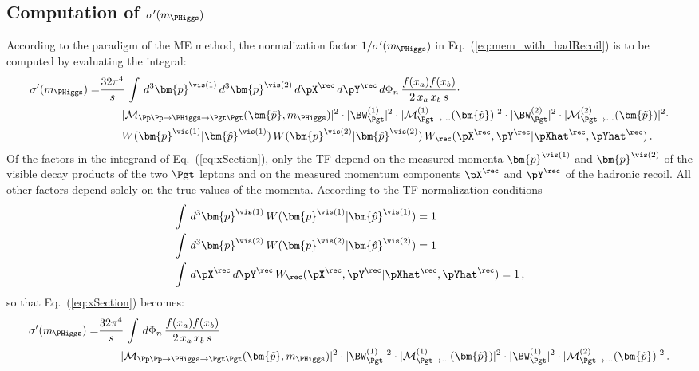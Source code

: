 \subsection{Computation of $\sigma'(m_{\PHiggs})$}
\label{sec:mem_xSection}

According to the paradigm of the ME method, the normalization factor
$1/\sigma'(m_{\PHiggs})$ in Eq.~(\ref{eq:mem_with_hadRecoil}) is to be computed
by evaluating the integral:
\begin{align}
\sigma'(m_{\PHiggs}) = &
  \frac{32\pi^{4}}{s} \, \int \, d^{3}\bm{p}^{\vis(1)} \, d^{3}\bm{p}^{\vis(2)} \, d\pX^{\rec} \, d\pY^{\rec} \, 
  d\Phi_{n} \, \frac{f(x_{a}) f(x_{b})}{2 \, x_{a} \, x_{b} \, s} \cdot \hspace{2cm} \nonumber \\
& \qquad \vert \mathcal{M}_{\Pp\Pp \to \PHiggs \to \Pgt\Pgt}(\bm{\tilde{p}},m_{\PHiggs}) \vert^{2} 
  \cdot \vert \BW^{(1)}_{\Pgt} \vert^{2} \cdot \vert \mathcal{M}^{(1)}_{\Pgt\to\cdots}(\bm{\tilde{p}}) \vert^{2} 
  \cdot \vert \BW^{(2)}_{\Pgt} \vert^{2} \cdot \vert
  \mathcal{M}^{(2)}_{\Pgt\to\cdots}(\bm{\tilde{p}}) \vert^{2} \cdot \nonumber \\
& \qquad W(\bm{p}^{\vis(1)}|\bm{\hat{p}}^{\vis(1)}) \, W(\bm{p}^{\vis(2)}|\bm{\hat{p}}^{\vis(2)}) \, W_{\rec}( \pX^{\rec},\pY^{\rec} | \pXhat^{\rec},\pYhat^{\rec} ) \, .
\label{eq:xSection}
\end{align}
Of the factors in the integrand of Eq.~(\ref{eq:xSection}),
only the TF depend on the measured momenta $\bm{p}^{\vis(1)}$ and $\bm{p}^{\vis(2)}$ of the visible decay products of the two $\Pgt$ leptons
and on the measured momentum components $\pX^{\rec}$ and $\pY^{\rec}$ of the hadronic recoil.
All other factors depend solely on the true values of the momenta.
According to the TF normalization conditions
\begin{align}
& \int \, d^{3}\bm{p}^{\vis(1)} \, W(\bm{p}^{\vis(1)}|\bm{\hat{p}}^{\vis(1)}) = 1 \nonumber \\
& \int \, d^{3}\bm{p}^{\vis(2)} \, W(\bm{p}^{\vis(2)}|\bm{\hat{p}}^{\vis(2)}) = 1 \nonumber \\
& \int \, d\pX^{\rec} \, d\pY^{\rec} \, W_{\rec}( \pX^{\rec},\pY^{\rec} | \pXhat^{\rec},\pYhat^{\rec} ) = 1 \, ,
\end{align}
so that Eq.~(\ref{eq:xSection}) becomes:
\begin{align}
\sigma'(m_{\PHiggs}) = &
  \frac{32\pi^{4}}{s} \, \int \, 
  d\Phi_{n} \, \frac{f(x_{a}) f(x_{b})}{2 \, x_{a} \, x_{b} \, s} \,
  \hspace{2cm} \nonumber \\
& \qquad \vert \mathcal{M}_{\Pp\Pp \to \PHiggs \to
    \Pgt\Pgt}(\bm{\tilde{p}},m_{\PHiggs}) \vert^{2} 
  \cdot \vert \BW^{(1)}_{\Pgt} \vert^{2} \cdot \vert \mathcal{M}^{(1)}_{\Pgt\to\cdots}(\bm{\tilde{p}}) \vert^{2} 
  \cdot \vert \BW^{(1)}_{\Pgt} \vert^{2} \cdot \vert \mathcal{M}^{(2)}_{\Pgt\to\cdots}(\bm{\tilde{p}}) \vert^{2} \, .
\label{eq:xSection2}
\end{align}

